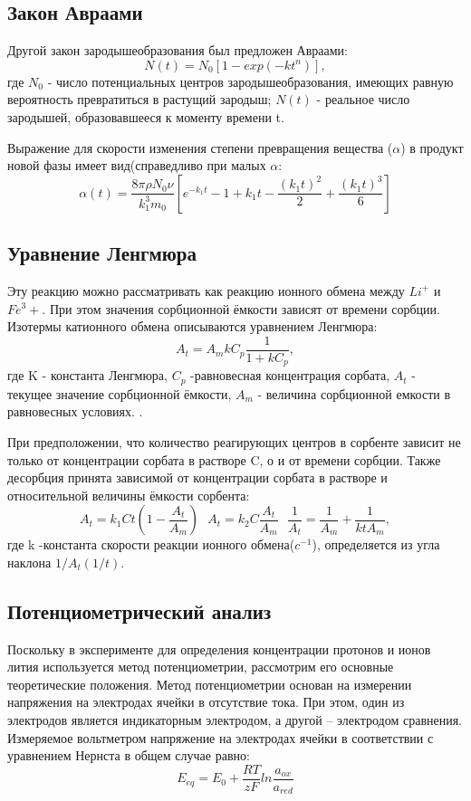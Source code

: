 \documentclass[a4paper,12pt]{article} %
\begin{document}
\subsection{Закон Авраами}Другой закон зародышеобразования был предложен Авраами:
\begin{equation}
    N(t) = N_0[1-exp(-kt^n)],
\end{equation}
где $N_0$ - число потенциальных центров зародышеобразования, имеющих равную вероятность превратиться в растущий зародыш; $N(t)$ -  реальное число зародышей, образовавшееся к моменту времени t.\par 
Выражение для скорости изменения степени превращения вещества ($\alpha$) в продукт новой фазы имеет вид(справедливо при малых {$\alpha$}:
\begin{equation}
    \alpha(t) =\frac{8\pi \rho N_0\nu}{k_1^3m_0}[e^{-k_1t}-1+k_1t-\frac{(k_1t)^2}{2}+\frac{(k_1t)^3}{6}]
\end{equation}
\subsection{Уравнение Ленгмюра}\par 
Эту реакцию можно рассматривать как реакцию ионного обмена между $Li^+$ и $Fe^3+$. При этом значения сорбционной ёмкости зависят от времени сорбции. Изотермы катионного обмена описываются уравнением Ленгмюра:
\begin{equation}
    A_t = A_mkC_p\frac{1}{1+kC_p},
\end{equation}
где K - константа Ленгмюра, $C_p$ -равновесная концентрация сорбата, $A_t$ - текущее значение сорбционной ёмкости, $A_m$ - величина сорбционной емкости в равновесных условиях. .\par 
При предположении, что количество реагирующих центров в сорбенте зависит не только от концентрации сорбата в растворе C, о и от времени сорбции. Также десорбция принята зависимой от концентрации сорбата в растворе и относительной величины ёмкости сорбента:
\begin{equation}
    A_t = k_1Ct(1-\frac{A_t}{A_m})\ \ \ A_t = k_2C\frac{A_t}{A_m}\ \ \ \frac{1}{A_t} = \frac{1}{A_m} + \frac{1}{ktA_m},
\end{equation}
где k -константа скорости реакции ионного обмена($c^{-1}$), определяется из угла наклона $1/A_t(1/t)$.\par 
\subsection{Потенциометрический анализ}Поскольку в эксперименте для определения концентрации протонов и ионов лития используется метод потенциометрии, рассмотрим его основные теоретические положения. Метод потенциометрии основан на измерении напряжения на электродах ячейки в отсутствие тока. При этом, один из электродов является индикаторным электродом, а другой – электродом сравнения. Измеряемое вольтметром напряжение на электродах ячейки в соответствии с уравнением Нернста в общем случае равно: 
\begin{equation}
    E_{eq} = E_0 +\frac{RT}{zF}ln\frac{a_{ox}}{a_{red}}
\end{equation}
\end{document}
